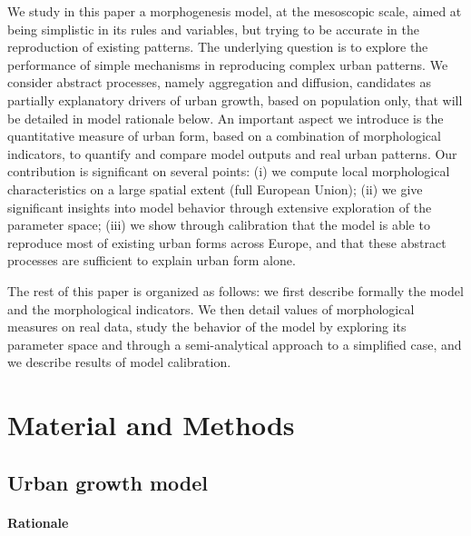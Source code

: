 \documentclass[10pt,letterpaper]{article}
\begin{document}


We study in this paper a morphogenesis model, at the mesoscopic scale, aimed at being simplistic in its rules and variables, but trying to be accurate in the reproduction of existing patterns. The underlying question is to explore the performance of simple mechanisms in reproducing complex urban patterns. We consider abstract processes, namely aggregation and diffusion, candidates as partially explanatory drivers of urban growth, based on population only, that will be detailed in model rationale below. An important aspect we introduce is the quantitative measure of urban form, based on a combination of morphological indicators, to quantify and compare model outputs and real urban patterns. Our contribution is significant on several points: (i) we compute local morphological characteristics on a large spatial extent (full European Union); (ii) we give significant insights into model behavior through extensive exploration of the parameter space; (iii) we show through calibration that the model is able to reproduce most of existing urban forms across Europe, and that these abstract processes are sufficient to explain urban form alone.


The rest of this paper is organized as follows: we first describe formally the model and the morphological indicators. We then detail values of morphological measures on real data, study the behavior of the model by exploring its parameter space and through a semi-analytical approach to a simplified case, and we describe results of model calibration.


\section*{Material and Methods}


\subsection*{Urban growth model}



\paragraph*{Rationale}
\end{document}
